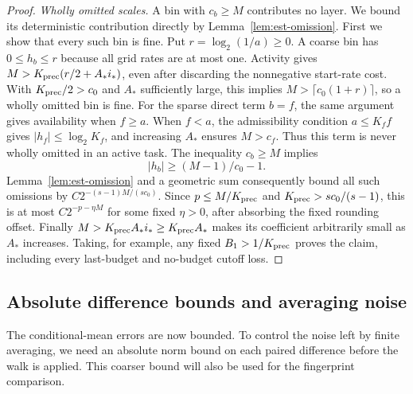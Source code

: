 \begin{proof}
\emph{Wholly omitted scales.}  A bin with $c_b\ge M$ contributes no
layer.  We bound its deterministic contribution directly by
Lemma~\ref{lem:est-omission}.  First we show that every such bin is fine.
Put $r=\log_2(1/a)\ge0$.
A coarse bin has $0\le h_b\le r$ because all grid rates are at most one.
Activity gives
$M>K_{\rm prec}(r/2+A_*i_*)$, even after discarding the nonnegative
start-rate cost.  With $K_{\rm prec}/2>c_0$ and $A_*$ sufficiently large,
this implies $M>\lceil c_0(1+r)\rceil$, so a wholly omitted bin is fine.
For the sparse direct term $b=f$, the same argument gives availability
when $f\ge a$.  When $f<a$, the admissibility condition $a\le K_f f$
gives $|h_f|\le\log_2 K_f$, and increasing $A_*$ ensures $M>c_f$.
Thus this term is never wholly omitted in an active task.
The inequality $c_b\ge M$ implies
\[
 |h_b|\ge (M-1)/c_0-1.
\]
Lemma~\ref{lem:est-omission} and a geometric sum consequently bound all
such omissions by
$C2^{-(s-1)M/(s c_0)}$.  Since $p\le M/K_{\rm prec}$ and
$K_{\rm prec}>s c_0/(s-1)$, this is at most
$C2^{-p-\eta M}$ for some fixed $\eta>0$, after absorbing the fixed
rounding offset.  Finally $M>K_{\rm prec}A_*i_*\ge K_{\rm prec}A_*$
makes its coefficient arbitrarily small as $A_*$ increases.
Taking, for example, any fixed $B_1>1/K_{\rm prec}$ proves the claim,
including every last-budget and no-budget cutoff loss.
\end{proof}

\subsection{Absolute difference bounds and averaging noise}

The conditional-mean errors are now bounded.  To control the noise left
by finite averaging, we need an absolute norm bound on each paired
difference before the walk is applied.  This coarser bound will also be
used for the fingerprint comparison.


